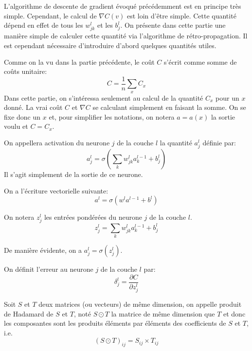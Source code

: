 L'algorithme de descente de gradient évoqué précédemment est en principe 
très simple. Cependant, le calcul de $\nabla C(v)$ est loin d'être simple. 
Cette quantité dépend en effet de tous les $w_{jk}^{l}$ et les $b_{j}^{l}$.
On présente dans cette partie une manière simple de calculer cette quantité 
via l'algorithme de rétro-propagation. 
Il est cependant nécessaire d'introduire d'abord quelques quantités utiles.

Comme on la vu dans la partie précédente, le coût $C$ s'écrit comme somme 
de coûts unitaire:
\[
C = \frac{1}{n} \sum_{x} C_x
\]
Dans cette partie, on s'intéressa seulement au calcul de la quantité $C_x$ pour un $x$ donné. 
La vrai coût $C$ et $\nabla C$ se calculant simplement en faisant la somme.
On se fixe donc un $x$ et, pour simplifier les notations, on notera $a = a(x)$ 
la sortie voulu et $C = C_x$.

\begin{definition}
On appellera activation du neurone $j$ de la couche $l$ la quantité $a_{j}^{l}$ 
définie par:
\[
a_{j}^{l} = \sigma \left( \sum_{k} w_{jk}^{l} a_{k}^{l-1} + b_{j}^{l} \right)
\]
Il s'agit simplement de la sortie de ce neurone.
\end{definition}


\begin{proposition}
On a l'écriture vectorielle suivante:
\[
a^{l} = \sigma ( w^{l} a^{l-1} + b^{l} )
\]
\end{proposition}


\begin{definition}
On notera $z_{j}^{l}$ les entrées pondérées du neurone $j$ de la couche $l$.
\[
z_{j}^{l} = \sum_{k} w_{jk}^{l} a_{k}^{l-1} + b_{j}^{l}
\]
\end{definition}

De manière évidente, on a $a_{j}^{l} = \sigma(z_{j}^{l})$.


\begin{definition}
On définit l'erreur au neurone $j$ de la couche $l$ par:
\[
\delta_{j}^{l} = \frac{\partial C}{\partial z_{j}^{l}}
\]
\end{definition}


\begin{definition}
Soit $S$ et $T$ deux matrices (ou vecteurs) de même dimension, on appelle 
produit de Hadamard de $S$ et $T$, noté $S \odot T$ la matrice de même dimension 
que $T$ et donc les composantes sont les produits éléments par éléments des 
coefficients de $S$ et $T$, i.e.\/
\[
(S \odot T)_{ij} = S_{ij} \times T_{ij}
\]
\end{definition}



